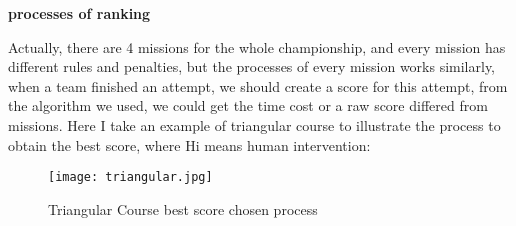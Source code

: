 \item{\textbf{processes of ranking}}

Actually, there are 4 missions for the whole championship, and every mission has different rules and penalties, but the processes of every mission works similarly, when a team finished an attempt, we should create a score for this attempt, from the algorithm we used, we could get the time cost or a raw score differed from missions. Here I take an example of triangular course to illustrate the process to obtain the best score, where Hi means human intervention:
\begin{figure}[h!]
\centering
\texttt{[image: triangular.jpg]}
\caption{Triangular Course best score chosen process }
\label{fig-sample}
\end{figure}


